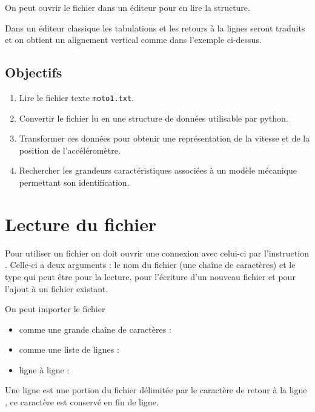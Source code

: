 On peut ouvrir le fichier dans un éditeur pour en lire la structure. 

Dans un éditeur classique les tabulations et les retours à la lignes seront traduits et on obtient un alignement vertical comme dans l'exemple ci-dessus.
\subsection{Objectifs}
\begin{enumerate}
  \item Lire le fichier texte \texttt{moto1.txt}.
  \item Convertir le fichier lu en une structure de données utilisable par python.
  \item Transformer ces données pour obtenir une représentation de la vitesse et de la position de l'accéléromètre.
  \item Rechercher les grandeurs caractéristiques associées à un modèle mécanique permettant son identification.
\end{enumerate}
\newpage
\section{Lecture du fichier}
Pour utiliser un fichier on doit ouvrir une connexion avec celui-ci par l'instruction . Celle-ci a deux arguments : le nom du fichier (une chaîne de caractères) et le type qui peut être  pour la lecture,  pour l'écriture d'un nouveau fichier et  pour l'ajout à un fichier existant. 

On peut importer le fichier 
\begin{itemize}
\item comme une grande chaîne de caractères : 
\item comme une liste de lignes : 
\item ligne à ligne : 
\end{itemize}
Une ligne est une portion du fichier délimitée par le caractère de retour à la ligne , ce caractère est conservé en fin de ligne.


